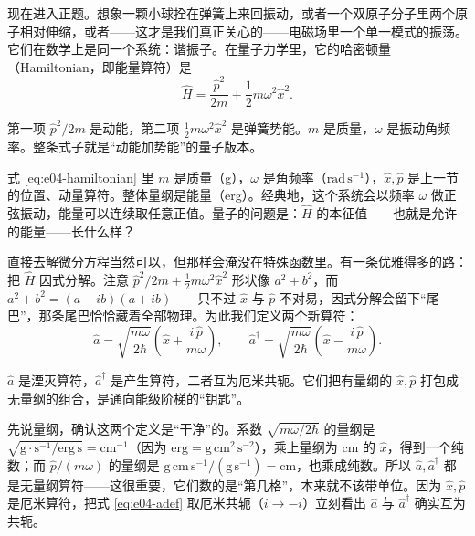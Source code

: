现在进入正题。想象一颗小球拴在弹簧上来回振动，或者一个双原子分子里两个原子相对伸缩，或者——这才是我们真正关心的——电磁场里一个单一模式的振荡。它们在数学上是同一个系统：谐振子。在量子力学里，它的哈密顿量（Hamiltonian，即能量算符）是
\begin{equation}
  \hat H=\frac{\hat p^2}{2m}+\frac{1}{2}m\omega^2\hat x^2 .
  \label{eq:e04-hamiltonian}
\end{equation}
\begin{formulaexplain}
第一项 \(\hat p^2/2m\) 是动能，第二项 \(\tfrac12 m\omega^2\hat x^2\) 是弹簧势能。\(m\) 是质量，\(\omega\) 是振动角频率。整条式子就是“动能加势能”的量子版本。
\end{formulaexplain}
式 \eqref{eq:e04-hamiltonian} 里 \(m\) 是质量（g），\(\omega\) 是角频率（\(\mathrm{rad\,s^{-1}}\)），\(\hat x,\hat p\) 是上一节的位置、动量算符。整体量纲是能量（erg）。经典地，这个系统会以频率 \(\omega\) 做正弦振动，能量可以连续取任意正值。量子的问题是：\(\hat H\) 的本征值——也就是允许的能量——长什么样？

直接去解微分方程当然可以，但那样会淹没在特殊函数里。有一条优雅得多的路：把 \(\hat H\) 因式分解。注意 \(\hat p^2/2m+\tfrac12 m\omega^2\hat x^2\) 形状像 \(a^2+b^2\)，而 \(a^2+b^2=(a-ib)(a+ib)\)——只不过 \(\hat x\) 与 \(\hat p\) 不对易，因式分解会留下“尾巴”，那条尾巴恰恰藏着全部物理。为此我们定义两个新算符：
\begin{equation}
  \hat a=\sqrt{\frac{m\omega}{2\hbar}}\left(\hat x+\frac{i\,\hat p}{m\omega}\right),
  \qquad
  \hat a^\dagger=\sqrt{\frac{m\omega}{2\hbar}}\left(\hat x-\frac{i\,\hat p}{m\omega}\right).
  \label{eq:e04-adef}
\end{equation}
\begin{formulaexplain}
\(\hat a\) 是湮灭算符，\(\hat a^\dagger\) 是产生算符，二者互为厄米共轭。它们把有量纲的 \(\hat x,\hat p\) 打包成无量纲的组合，是通向能级阶梯的“钥匙”。
\end{formulaexplain}
先说量纲，确认这两个定义是“干净”的。系数 \(\sqrt{m\omega/2\hbar}\) 的量纲是 \(\sqrt{\mathrm{g}\cdot\mathrm{s^{-1}}/\mathrm{erg\,s}}=\mathrm{cm^{-1}}\)（因为 \(\mathrm{erg}=\mathrm{g\,cm^2\,s^{-2}}\)），乘上量纲为 cm 的 \(\hat x\)，得到一个纯数；而 \(\hat p/(m\omega)\) 的量纲是 \(\mathrm{g\,cm\,s^{-1}}/(\mathrm{g\,s^{-1}})=\mathrm{cm}\)，也乘成纯数。所以 \(\hat a,\hat a^\dagger\) 都是无量纲算符——这很重要，它们数的是“第几格”，本来就不该带单位。因为 \(\hat x,\hat p\) 是厄米算符，把式 \eqref{eq:e04-adef} 取厄米共轭（\(i\to -i\)）立刻看出 \(\hat a\) 与 \(\hat a^\dagger\) 确实互为共轭。

